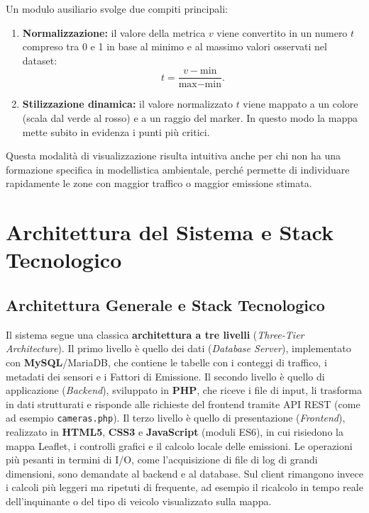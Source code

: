 \documentclass[12pt, oneside]{extbook}
\begin{document}
Un modulo ausiliario svolge due compiti principali:
\begin{enumerate}
  \item \textbf{Normalizzazione:} il valore della
        metrica $v$ viene convertito in un numero $t$ compreso tra 0 e 1 in
        base al minimo e al massimo valori osservati nel dataset:
        \[
          t = \frac{v - \text{min}}{\text{max} - \text{min}}.
        \]
  \item \textbf{Stilizzazione dinamica:} il valore
        normalizzato $t$ viene mappato a un colore (scala dal verde al
        rosso) e a un raggio del marker. In questo modo la mappa mette subito
        in evidenza i punti più critici.
\end{enumerate}
Questa modalità di visualizzazione risulta intuitiva anche per chi non ha
una formazione specifica in modellistica ambientale, perché permette di
individuare rapidamente le zone con maggior traffico o maggior emissione
stimata.

\chapter{Architettura del Sistema e Stack Tecnologico}
\section{Architettura Generale e Stack Tecnologico}

Il sistema segue una classica \textbf{architettura a tre livelli}
(\emph{Three-Tier Architecture}). Il primo livello è quello dei dati
(\emph{Database Server}), implementato con \textbf{MySQL}/MariaDB, che
contiene le tabelle con i conteggi di traffico, i metadati dei sensori e
i Fattori di Emissione. Il secondo livello è quello di applicazione
(\emph{Backend}), sviluppato in \textbf{PHP}, che riceve i file di
input, li trasforma in dati strutturati e risponde alle richieste del
frontend tramite API REST (come ad esempio \texttt{cameras.php}). Il
terzo livello è quello di presentazione (\emph{Frontend}), realizzato
in \textbf{HTML5}, \textbf{CSS3} e \textbf{JavaScript} (moduli ES6), in
cui risiedono la mappa Leaflet, i controlli grafici e il calcolo locale
delle emissioni. Le operazioni più pesanti in termini di I/O, come l'acquisizione di file
di log di grandi dimensioni, sono demandate al backend e al database.
Sul client rimangono invece i calcoli più leggeri ma ripetuti di
frequente, ad esempio il ricalcolo in tempo reale dell'inquinante o del
tipo di veicolo visualizzato sulla mappa.
\end{document}
